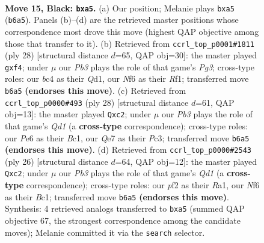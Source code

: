 \documentclass[11pt]{article}
\begin{document}
\clearpage

\begin{figure}[p]\centering
\begin{subfigure}{0.46\textwidth}\centering
\resizebox{\linewidth}{!}{%
\newchessgame
\chessboard[
  setfen={rr4k1/p1pbqppp/1p2pn2/B7/2BPP2P/5NP1/PP3P2/R2QR1K1 b - - 0 15},
  showmover=false,
  pgfstyle=straightmove, color=movearrow, markmove={b6-a5}
]}
\caption{}
\end{subfigure}\hfill
\begin{subfigure}{0.46\textwidth}\centering
\resizebox{\linewidth}{!}{%
\newchessgame
\chessboard[
  setfen={r2qr1k1/pbpn1ppp/1p6/3p4/3P1b2/1PR2NP1/P3PPBP/3Q1RK1 w - - 0 15},
  showmover=false,
  pgfstyle=straightmove, color=movearrow, markmove={g3-f4}
]}
\caption{}
\end{subfigure}
\\[4pt]
\begin{subfigure}{0.46\textwidth}\centering
\resizebox{\linewidth}{!}{%
\newchessgame
\chessboard[
  setfen={2rq1rk1/pp2ppbp/2n3p1/3pP3/3P4/P1P2N1P/2b2PP1/R1BQR1K1 w - - 0 15},
  showmover=false,
  pgfstyle=straightmove, color=movearrow, markmove={d1-c2}
]}
\caption{}
\end{subfigure}\hfill
\begin{subfigure}{0.46\textwidth}\centering
\resizebox{\linewidth}{!}{%
\newchessgame
\chessboard[
  setfen={r2q1rk1/pp2ppbp/2n3p1/3pP3/3P4/P1P2N1P/2b2PP1/R1BQ1RK1 w - - 0 14},
  showmover=false,
  pgfstyle=straightmove, color=movearrow, markmove={d1-c2}
]}
\caption{}
\end{subfigure}
\caption{\textbf{Move 15, Black: \texttt{bxa5}.} (a) Our position; Melanie plays \texttt{bxa5} (\texttt{b6a5}). Panels (b)--(d) are the retrieved master positions whose correspondence most drove this move (highest QAP objective among those that transfer to it). (b) Retrieved from \texttt{ccrl\_top\_p0001\#1811} (ply 28) [structural distance $d$=65, QAP obj=30]: the master played \texttt{gxf4}; under $\mu$ our \emph{Pb3} plays the role of that game's \emph{Pg3}; cross-type roles: our \emph{b}c4 as their \emph{Q}d1, our \emph{N}f6 as their \emph{R}f1; transferred move \texttt{b6a5} \textbf{(endorses this move)}. (c) Retrieved from \texttt{ccrl\_top\_p0000\#493} (ply 28) [structural distance $d$=61, QAP obj=13]: the master played \texttt{Qxc2}; under $\mu$ our \emph{Pb3} plays the role of that game's \emph{Qd1} (a \textbf{cross-type} correspondence); cross-type roles: our \emph{P}e6 as their \emph{B}c1, our \emph{Q}e7 as their \emph{P}c3; transferred move \texttt{b6a5} \textbf{(endorses this move)}. (d) Retrieved from \texttt{ccrl\_top\_p0000\#2543} (ply 26) [structural distance $d$=64, QAP obj=12]: the master played \texttt{Qxc2}; under $\mu$ our \emph{Pb3} plays the role of that game's \emph{Qd1} (a \textbf{cross-type} correspondence); cross-type roles: our \emph{p}f2 as their \emph{R}a1, our \emph{N}f6 as their \emph{B}c1; transferred move \texttt{b6a5} \textbf{(endorses this move)}. Synthesis: 4 retrieved analogs transferred to \texttt{bxa5} (summed QAP objective 67, the strongest correspondence among the candidate moves); Melanie committed it via the \texttt{search} selector.}
\label{fig:thought-m29}
\end{figure}
\end{document}
